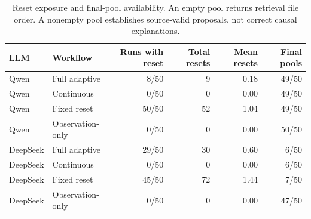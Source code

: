 \begin{table}[t]
\caption{Reset exposure and final-pool availability. An empty pool returns retrieval file order. A nonempty pool establishes source-valid proposals, not correct causal explanations.}\label{tab:eval-mechanisms}
\centering\small
\begin{tabular*}{\textwidth}{@{\extracolsep{\fill}}llrrrr@{}}\toprule
LLM & Workflow & Runs with reset & Total resets & Mean resets & Final pools\\\midrule
Qwen & Full adaptive & 8/50 & 9 & 0.18 & 49/50\\
Qwen & Continuous & 0/50 & 0 & 0.00 & 49/50\\
Qwen & Fixed reset & 50/50 & 52 & 1.04 & 49/50\\
Qwen & Observation-only & 0/50 & 0 & 0.00 & 50/50\\
\midrule
DeepSeek & Full adaptive & 29/50 & 30 & 0.60 & 6/50\\
DeepSeek & Continuous & 0/50 & 0 & 0.00 & 6/50\\
DeepSeek & Fixed reset & 45/50 & 72 & 1.44 & 7/50\\
DeepSeek & Observation-only & 0/50 & 0 & 0.00 & 47/50\\
\bottomrule\end{tabular*}
\end{table}
